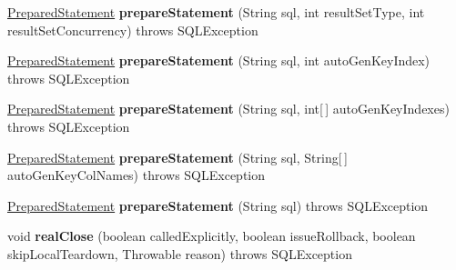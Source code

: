 \begin{DoxyCompactItemize}
\item 
\mbox{\label{classcom_1_1mysql_1_1jdbc_1_1_multi_host_my_s_q_l_connection_a2f09273c1266ae4772660ab375c811eb}} 
\mbox{\hyperlink{classcom_1_1mysql_1_1jdbc_1_1_prepared_statement}{Prepared\+Statement}} {\bfseries prepare\+Statement} (String sql, int result\+Set\+Type, int result\+Set\+Concurrency)  throws S\+Q\+L\+Exception 
\item 
\mbox{\label{classcom_1_1mysql_1_1jdbc_1_1_multi_host_my_s_q_l_connection_ad68acd8bb6d56cc88aa5497418874b4f}} 
\mbox{\hyperlink{classcom_1_1mysql_1_1jdbc_1_1_prepared_statement}{Prepared\+Statement}} {\bfseries prepare\+Statement} (String sql, int auto\+Gen\+Key\+Index)  throws S\+Q\+L\+Exception 
\item 
\mbox{\label{classcom_1_1mysql_1_1jdbc_1_1_multi_host_my_s_q_l_connection_abc93c9af97d5429d51b23cf20358c407}} 
\mbox{\hyperlink{classcom_1_1mysql_1_1jdbc_1_1_prepared_statement}{Prepared\+Statement}} {\bfseries prepare\+Statement} (String sql, int\mbox{[}$\,$\mbox{]} auto\+Gen\+Key\+Indexes)  throws S\+Q\+L\+Exception 
\item 
\mbox{\label{classcom_1_1mysql_1_1jdbc_1_1_multi_host_my_s_q_l_connection_a02f7dd6e3a113669b7d7309cadbd0513}} 
\mbox{\hyperlink{classcom_1_1mysql_1_1jdbc_1_1_prepared_statement}{Prepared\+Statement}} {\bfseries prepare\+Statement} (String sql, String\mbox{[}$\,$\mbox{]} auto\+Gen\+Key\+Col\+Names)  throws S\+Q\+L\+Exception 
\item 
\mbox{\label{classcom_1_1mysql_1_1jdbc_1_1_multi_host_my_s_q_l_connection_ac075fe21c90a1ec4be0c9e7de2fb24f5}} 
\mbox{\hyperlink{classcom_1_1mysql_1_1jdbc_1_1_prepared_statement}{Prepared\+Statement}} {\bfseries prepare\+Statement} (String sql)  throws S\+Q\+L\+Exception 
\item 
\mbox{\label{classcom_1_1mysql_1_1jdbc_1_1_multi_host_my_s_q_l_connection_a51fb15bd41ed529d3a6f2cfcccb230fe}} 
void {\bfseries real\+Close} (boolean called\+Explicitly, boolean issue\+Rollback, boolean skip\+Local\+Teardown, Throwable reason)  throws S\+Q\+L\+Exception 

\end{DoxyCompactItemize}
